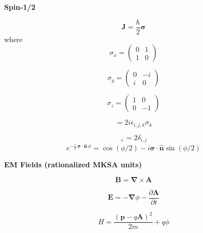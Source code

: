 \documentclass[11pt]{article}
\newcommand{\vect}[1]{\boldsymbol{\mathbf{#1}}}
\begin{document}
\begin{multicols}{2}
{\bf Spin-1/2}

\begin{equation}
\vect{J} = \frac{\hbar}{2} \vect{\sigma}
\end{equation}
where
\begin{equation}
\sigma_x = \left(
           \begin{array}{cc}
              0 & 1 \\
              1 & 0
           \end{array}
           \right)
\end{equation}

\begin{equation}
\sigma_y = \left(
           \begin{array}{cc}
              0 & -i \\
              i & 0
           \end{array}
           \right)
\end{equation}

\begin{equation}
\sigma_z = \left(
           \begin{array}{cc}
              1 & 0 \\
              0 & -1
           \end{array}
           \right)
\end{equation}

\begin{equation}
[ \sigma_i, \sigma_j ] = 2i \epsilon_{i,j,k} \sigma_k
\end{equation}

\begin{equation}
[\,\sigma_i,\sigma_j\,]_+ = 2 \delta_{i,j}
\end{equation}
\begin{equation}
e^{- \frac{i}{2} \, \vect{\sigma} \cdot \vect{\hat{n}} \, \phi
     }
  = \cos(\phi /2) - i \vect{\sigma} \cdot \vect{\hat{n}} \sin(\phi /2)
\end{equation}

{\bf EM Fields (rationalized MKSA units)}

\begin{equation}
\vect{B} = \vect{\nabla} \times \vect{A}
\end{equation}

\begin{equation}
\vect{E} = -\vect{\nabla} \phi - \frac{\partial \vect{A}}{\partial t}
\end{equation}

\begin{equation}
H = \frac{(\vect{p} - q \vect{A})^2}{2m} + q \phi
\end{equation}


\end{multicols}
\end{document}
